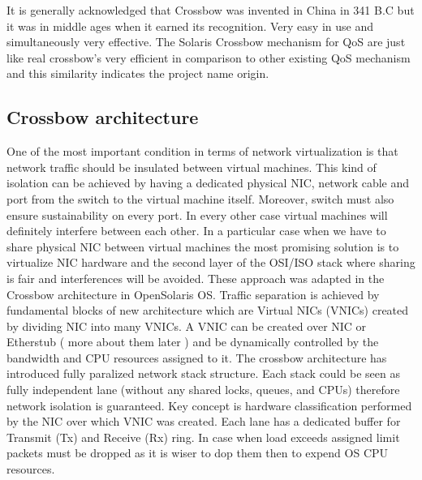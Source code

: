 \documentclass[11pt]{book}
\begin{document}

        It is generally acknowledged that Crossbow was invented in China in 341 B.C but it was in middle ages when 
        it earned its recognition. Very easy in use and simultaneously very effective. The Solaris Crossbow mechanism 
        for QoS are just like real crossbow's very efficient in comparison to other existing QoS mechanism and this
        similarity indicates the project name origin.

    \subsection{Crossbow architecture}

        One of the most important condition in terms of network virtualization is that network traffic
      should be insulated between virtual machines. This kind of isolation can be achieved by having
      a dedicated physical NIC, network cable and port from the switch to the virtual machine
      itself. Moreover, switch must also ensure sustainability on every port. In every other case
      virtual machines will definitely interfere between each other.
        In a particular case when we have to share physical NIC between virtual machines the most promising solution is to
      virtualize NIC hardware and the second layer of the OSI/ISO stack where sharing is fair and
      interferences will be avoided. These approach was adapted in the Crossbow architecture in
      OpenSolaris OS.
        Traffic separation is achieved by fundamental blocks of new architecture
      which are Virtual NICs (VNICs) created by dividing NIC into many VNICs. 
        A VNIC can be created over NIC or Etherstub ( more about them later ) and be dynamically controlled by the
      bandwidth and CPU resources assigned to it.
        The crossbow architecture has introduced fully paralized network stack structure. Each stack could be seen as fully independent lane (without
      any shared locks, queues, and CPUs) therefore network isolation is guaranteed. Key concept is
      hardware classification performed by the NIC over which VNIC was created. Each lane has a
      dedicated buffer for Transmit (Tx) and Receive (Rx) ring. In case when load exceeds assigned
      limit packets must be dropped as it is wiser to dop them then to expend OS CPU resources. 
\end{document}
